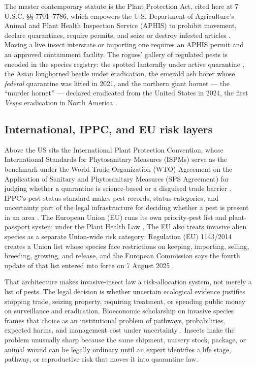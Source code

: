 \documentclass[
  english,
]{article}
\begin{document}
The master contemporary statute is the Plant Protection Act, cited here
at 7 U.S.C. §§ 7701--7786, which empowers the U.S. Department of
Agriculture's Animal and Plant Health Inspection Service (APHIS) to
prohibit movement, declare quarantines, require permits, and seize or
destroy infested articles \citep{ppa2000, usc7_7712}. Moving a live
insect interstate or importing one requires an APHIS permit and an
approved containment facility. The rogues' gallery of regulated pests is
encoded in the species registry: the spotted lanternfly under active
quarantine \citep{aphis_slf}, the Asian longhorned beetle under
eradication, the emerald ash borer whose \emph{federal} quarantine was
lifted in 2021, and the northern giant hornet --- the ``murder hornet''
--- declared eradicated from the United States in 2024, the first
\emph{Vespa} eradication in North America \citep{guardian_hornet}.

\subsection{International, IPPC, and EU risk
layers}\label{international-ippc-and-eu-risk-layers}

Above the US sits the International Plant Protection Convention, whose
International Standards for Phytosanitary Measures (ISPMs) serve as the
benchmark under the World Trade Organization (WTO) Agreement on the
Application of Sanitary and Phytosanitary Measures (SPS Agreement) for
judging whether a quarantine is science-based or a disguised trade
barrier \citep{ippc_ispm}. IPPC's pest-status standard makes pest
records, status categories, and uncertainty part of the legal
infrastructure for deciding whether a pest is present in an area
\citep{ippc_ispm8}. The European Union (EU) runs its own priority-pest
list and plant-passport system under the Plant Health Law
\citep{eu2016_2031}. The EU also treats invasive alien species as a
separate Union-wide risk category: Regulation (EU) 1143/2014 creates a
Union list whose species face restrictions on keeping, importing,
selling, breeding, growing, and release, and the European Commission
says the fourth update of that list entered into force on 7 August 2025
\citep{eu1143_2014, ec_ias2026}.

That architecture makes invasive-insect law a risk-allocation system,
not merely a list of pests. The legal decision is whether uncertain
ecological evidence justifies stopping trade, seizing property,
requiring treatment, or spending public money on surveillance and
eradication. Bioeconomic scholarship on invasive species frames that
choice as an institutional problem of pathways, probabilities, expected
harms, and management cost under uncertainty
\citep{lodge2016bioeconomics_invasive_species}. Insects make the problem
unusually sharp because the same shipment, nursery stock, package, or
animal wound can be legally ordinary until an expert identifies a life
stage, pathway, or reproductive risk that moves it into quarantine law.
\end{document}

